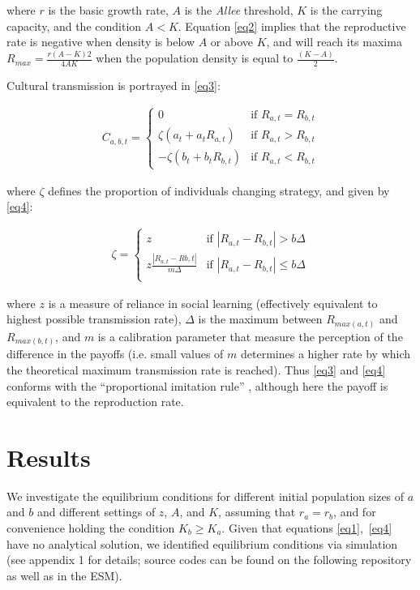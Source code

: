 \documentclass[preprint,authoryear]{elsarticle}
\begin{document}
where $r$ is the basic growth rate, $A$ is the \emph{Allee} threshold,  $K$ is the carrying capacity, and the condition $A < K$. Equation \eqref{eq2} implies that the reproductive rate is negative when density is below $A$ or above $K$, and will reach its maxima $R_{max}=\frac{r(A-K)2}{4AK}$ when the population density is equal to $\frac{(K-A)}{2}$. 

Cultural transmission is portrayed in \eqref{eq3}:

\begin{align}
\label{eq3}
C_{a,b,t} = 
\begin{cases}
0& \text{if } R_{a,t} = R_{b,t}\\
\zeta(a_t+a_tR_{a,t})& \text{if } R_{a,t} > R_{b,t}\\
-\zeta(b_t+b_tR_{b,t})& \text{if } R_{a,t} < R_{b,t}
\end{cases}
\end{align}

where $\zeta$ defines the proportion of individuals changing strategy, and given by \eqref{eq4}:

\begin{align}
\label{eq4}
\zeta = 
\begin{cases}
z& \text{if }|R_{a,t}-R_{b,t}| > b\Delta\\
z\frac{|R_{a,t}-R{b,t}|}{m\Delta}& \text{if }|R_{a,t}-R_{b,t}| \leq b\Delta\\
\end{cases}
\end{align}

where $z$ is a measure of reliance in social learning (effectively equivalent to highest possible transmission rate),  $\Delta$ is the maximum between $R_{max(a,t)}$ and $R_{max(b,t)}$, and $m$ is a calibration parameter that measure the perception of the difference in the payoffs (i.e. small values of $m$ determines a higher rate by which the theoretical maximum transmission rate is reached). Thus \eqref{eq3} and \eqref{eq4}  conforms with the ``proportional imitation rule''  \citep{schlag1998}, although here the payoff is equivalent to the reproduction rate. 

\section{Results}

We investigate the equilibrium conditions for different initial population sizes of  $a$ and $b$ and different settings of $z$, $A$, and $K$, assuming that  $r_a=r_b$, and for convenience holding the condition $K_b \geq K_a$. Given that equations \ref{eq1},~\ref{eq4} have no analytical solution, we identified equilibrium conditions via simulation (see appendix 1 for details; source codes can be found on the following repository %
as well as in the ESM).  
\end{document}
